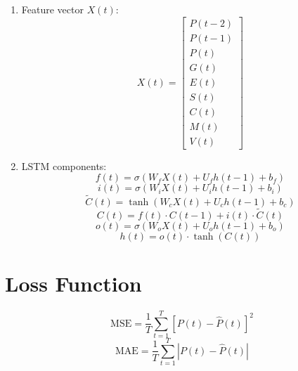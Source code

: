 \documentclass[12pt]{article}
\begin{document}
\begin{enumerate}
    \item Feature vector \( X(t) \):
    \[
    X(t) = \begin{bmatrix}
    P(t-2) \\
    P(t-1) \\
    P(t) \\
    G(t) \\
    E(t) \\
    S(t) \\
    C(t) \\
    M(t) \\
    V(t)
    \end{bmatrix}
    \]
    \item LSTM components:
    \[
    f(t) = \sigma(W_f X(t) + U_f h(t-1) + b_f)
    \]
    \[
    i(t) = \sigma(W_i X(t) + U_i h(t-1) + b_i)
    \]
    \[
    \tilde{C}(t) = \tanh(W_c X(t) + U_c h(t-1) + b_c)
    \]
    \[
    C(t) = f(t) \cdot C(t-1) + i(t) \cdot \tilde{C}(t)
    \]
    \[
    o(t) = \sigma(W_o X(t) + U_o h(t-1) + b_o)
    \]
    \[
    h(t) = o(t) \cdot \tanh(C(t))
    \]

\end{enumerate}

\section*{Loss Function}

\[
\text{MSE} = \frac{1}{T} \sum_{t=1}^T [P(t) - \hat{P}(t)]^2
\]
\[
\text{MAE} = \frac{1}{T} \sum_{t=1}^T |P(t) - \hat{P}(t)|
\]
\end{document}
